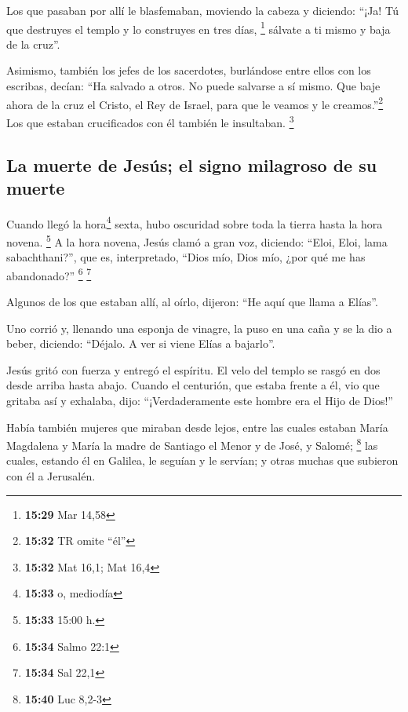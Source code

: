 \begin{paracol}{2}
 Los que pasaban por allí le blasfemaban, moviendo la
cabeza y diciendo: ``¡Ja! Tú que destruyes el templo y lo construyes en
tres días, \footnote{\textbf{15:29} Mar 14,58}  sálvate a
ti mismo y baja de la cruz''.

 Asimismo, también los jefes de los sacerdotes,
burlándose entre ellos con los escribas, decían: ``Ha salvado a otros.
No puede salvarse a sí mismo.  Que baje ahora de la cruz
el Cristo, el Rey de Israel, para que le veamos y le
creamos.''\footnote{\textbf{15:32} TR omite ``él''} Los que estaban
crucificados con él también le insultaban. \footnote{\textbf{15:32} Mat
  16,1; Mat 16,4}

\hypertarget{la-muerte-de-jesuxfas-el-signo-milagroso-de-su-muerte}{%
\subsection{La muerte de Jesús; el signo milagroso de su
muerte}\label{la-muerte-de-jesuxfas-el-signo-milagroso-de-su-muerte}}

 Cuando llegó la hora\footnote{\textbf{15:33} o, mediodía}
sexta, hubo oscuridad sobre toda la tierra hasta la hora novena.
\footnote{\textbf{15:33} 15:00 h.}  A la hora novena,
Jesús clamó a gran voz, diciendo: ``Eloi, Eloi, lama sabachthani?'', que
es, interpretado, ``Dios mío, Dios mío, ¿por qué me has abandonado?''
\footnote{\textbf{15:34} Salmo 22:1} \footnote{\textbf{15:34} Sal 22,1}

 Algunos de los que estaban allí, al oírlo, dijeron: ``He
aquí que llama a Elías''.

 Uno corrió y, llenando una esponja de vinagre, la puso
en una caña y se la dio a beber, diciendo: ``Déjalo. A ver si viene
Elías a bajarlo''.

 Jesús gritó con fuerza y entregó el espíritu.
 El velo del templo se rasgó en dos desde arriba hasta
abajo.  Cuando el centurión, que estaba frente a él, vio
que gritaba así y exhalaba, dijo: ``¡Verdaderamente este hombre era el
Hijo de Dios!''

 Había también mujeres que miraban desde lejos, entre las
cuales estaban María Magdalena y María la madre de Santiago el Menor y
de José, y Salomé; \footnote{\textbf{15:40} Luc 8,2-3} 
las cuales, estando él en Galilea, le seguían y le servían; y otras
muchas que subieron con él a Jerusalén.


\end{paracol}
